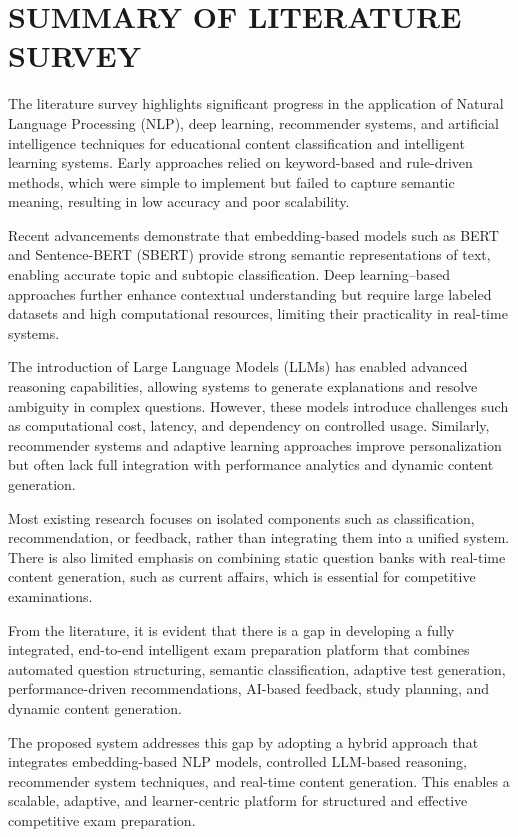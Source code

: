 \begin{sloppypar}
\section{\MakeUppercase{SUMMARY OF LITERATURE SURVEY}}

The literature survey highlights significant progress in the application of Natural Language Processing (NLP), deep learning, recommender systems, and artificial intelligence techniques for educational content classification and intelligent learning systems. Early approaches relied on keyword-based and rule-driven methods, which were simple to implement but failed to capture semantic meaning, resulting in low accuracy and poor scalability.

Recent advancements demonstrate that embedding-based models such as BERT and Sentence-BERT (SBERT) provide strong semantic representations of text, enabling accurate topic and subtopic classification. Deep learning--based approaches further enhance contextual understanding but require large labeled datasets and high computational resources, limiting their practicality in real-time systems.

The introduction of Large Language Models (LLMs) has enabled advanced reasoning capabilities, allowing systems to generate explanations and resolve ambiguity in complex questions. However, these models introduce challenges such as computational cost, latency, and dependency on controlled usage. Similarly, recommender systems and adaptive learning approaches improve personalization but often lack full integration with performance analytics and dynamic content generation.

Most existing research focuses on isolated components such as classification, recommendation, or feedback, rather than integrating them into a unified system. There is also limited emphasis on combining static question banks with real-time content generation, such as current affairs, which is essential for competitive examinations.

From the literature, it is evident that there is a gap in developing a fully integrated, end-to-end intelligent exam preparation platform that combines automated question structuring, semantic classification, adaptive test generation, performance-driven recommendations, AI-based feedback, study planning, and dynamic content generation.

The proposed system addresses this gap by adopting a hybrid approach that integrates embedding-based NLP models, controlled LLM-based reasoning, recommender system techniques, and real-time content generation. This enables a scalable, adaptive, and learner-centric platform for structured and effective competitive exam preparation.


\end{sloppypar}
